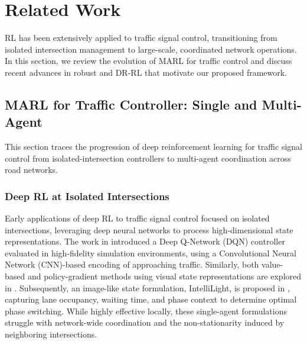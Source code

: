 \documentclass[lettersize,journal]{IEEEtran}
\begin{document}
\section{Related Work}
\label{sec:related_work}

RL has been extensively applied to traffic signal control, transitioning from isolated intersection management to large-scale, coordinated network operations. In this section, we review the evolution of MARL for traffic control and discuss recent advances in robust and DR-RL that motivate our proposed framework.

\subsection{MARL for Traffic Controller: Single and Multi-Agent}
\label{subsec:marl_tsc}
This section traces the progression of deep reinforcement learning for traffic signal control from isolated-intersection controllers to multi-agent coordination across road networks.

\subsubsection{Deep RL at Isolated Intersections}
Early applications of deep RL to traffic signal control focused on isolated intersections, leveraging deep neural networks to process high-dimensional state representations. The work in \cite{genders2016} introduced a Deep Q-Network (DQN) controller evaluated in high-fidelity simulation environments, using a Convolutional Neural Network (CNN)-based encoding of approaching traffic. Similarly, both value-based and policy-gradient methods using visual state representations are explored in \cite{mousavi2017}. Subsequently, an image-like state formulation, IntelliLight, is proposed in \cite{wei2018intellilight}, capturing lane occupancy, waiting time, and phase context to determine optimal phase switching. While highly effective locally, these single-agent formulations struggle with network-wide coordination and the non-stationarity induced by neighboring intersections.
\end{document}
